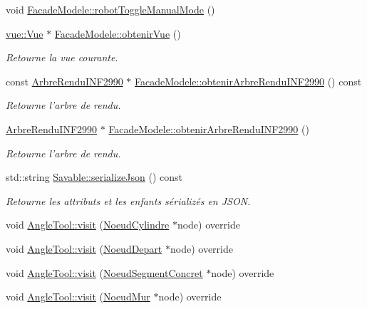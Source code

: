 \begin{DoxyCompactItemize}
\item 
void \hyperlink{group__inf2990_ga3e853c603a2393bbaf048b225eb47483}{Facade\-Modele\-::robot\-Toggle\-Manual\-Mode} ()
\item 
\hyperlink{classvue_1_1_vue}{vue\-::\-Vue} $\ast$ \hyperlink{group__inf2990_gaa56cf96b7e381e0f14e2c9a55be913bf}{Facade\-Modele\-::obtenir\-Vue} ()
\begin{DoxyCompactList}\small\item\em Retourne la vue courante. \end{DoxyCompactList}\item 
const \hyperlink{class_arbre_rendu_i_n_f2990}{Arbre\-Rendu\-I\-N\-F2990} $\ast$ \hyperlink{group__inf2990_gaf578161d03b2157cdaa3182900ff61cc}{Facade\-Modele\-::obtenir\-Arbre\-Rendu\-I\-N\-F2990} () const 
\begin{DoxyCompactList}\small\item\em Retourne l'arbre de rendu. \end{DoxyCompactList}\item 
\hyperlink{class_arbre_rendu_i_n_f2990}{Arbre\-Rendu\-I\-N\-F2990} $\ast$ \hyperlink{group__inf2990_ga12d5594db6a9507b24c7e1ffcd6751af}{Facade\-Modele\-::obtenir\-Arbre\-Rendu\-I\-N\-F2990} ()
\begin{DoxyCompactList}\small\item\em Retourne l'arbre de rendu. \end{DoxyCompactList}\item 
std\-::string \hyperlink{group__inf2990_ga454a7c175c0864c3656283bafcb8413e}{Savable\-::serialize\-Json} () const 
\begin{DoxyCompactList}\small\item\em Retourne les attributs et les enfants sérializés en J\-S\-O\-N. \end{DoxyCompactList}\item 
void \hyperlink{group__inf2990_ga925fee2b000babaae1c7947a732a0bba}{Angle\-Tool\-::visit} (\hyperlink{class_noeud_cylindre}{Noeud\-Cylindre} $\ast$node) override
\item 
void \hyperlink{group__inf2990_gaaa2fc24bde51948c2288c375f19d70ae}{Angle\-Tool\-::visit} (\hyperlink{class_noeud_depart}{Noeud\-Depart} $\ast$node) override
\item 
void \hyperlink{group__inf2990_ga0209990747f5f623c71076c02a3ed018}{Angle\-Tool\-::visit} (\hyperlink{class_noeud_segment_concret}{Noeud\-Segment\-Concret} $\ast$node) override
\item 
void \hyperlink{group__inf2990_ga5bf124eb8955a829e87743cc6a737b49}{Angle\-Tool\-::visit} (\hyperlink{class_noeud_mur}{Noeud\-Mur} $\ast$node) override

\end{DoxyCompactItemize}
